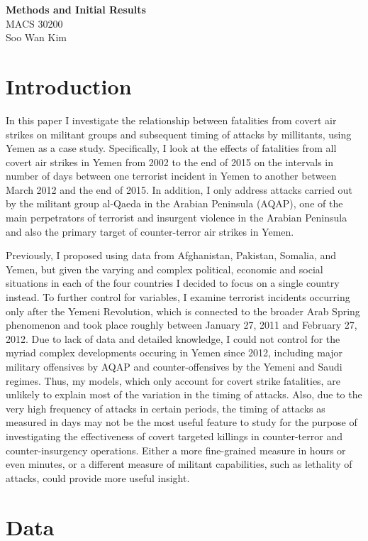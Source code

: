 \documentclass[letterpaper,12pt]{article}
\theoremstyle{definition}
\begin{document}
\begin{flushleft}
  \textbf{\large{Methods and Initial Results}} \\
  MACS 30200\\
  Soo Wan Kim
\end{flushleft}
\section{Introduction}

In this paper I investigate the relationship between fatalities from covert air strikes on militant groups and subsequent timing of attacks by millitants, using Yemen as a case study. Specifically, I look at the effects of fatalities from all covert air strikes in Yemen from 2002 to the end of 2015 on the intervals in number of days between one terrorist incident in Yemen to another between March 2012 and the end of 2015. In addition, I only address attacks carried out by the militant group al-Qaeda in the Arabian Peninsula (AQAP), one of the main perpetrators of terrorist and insurgent violence in the Arabian Peninsula and also the primary target of counter-terror air strikes in Yemen.

Previously, I proposed using data from Afghanistan, Pakistan, Somalia, and Yemen, but given the varying and complex political, economic and social situations in each of the four countries I decided to focus on a single country instead. To further control for variables, I examine terrorist incidents occurring only after the Yemeni Revolution, which is connected to the broader Arab Spring phenomenon and took place roughly between January 27, 2011 and February 27, 2012. Due to lack of data and detailed knowledge, I could not control for the myriad complex developments occuring in Yemen since 2012, including major military offensives by AQAP and counter-offensives by the Yemeni and Saudi regimes. Thus, my models, which only account for covert strike fatalities, are unlikely to explain most of the variation in the timing of attacks. Also, due to the very high frequency of attacks in certain periods, the timing of attacks as measured in days may not be the most useful feature to study for the purpose of investigating the effectiveness of covert targeted killings in counter-terror and counter-insurgency operations. Either a more fine-grained measure in hours or even minutes, or a different measure of militant capabilities, such as lethality of attacks, could provide more useful insight.

\section{Data}
\end{document}
